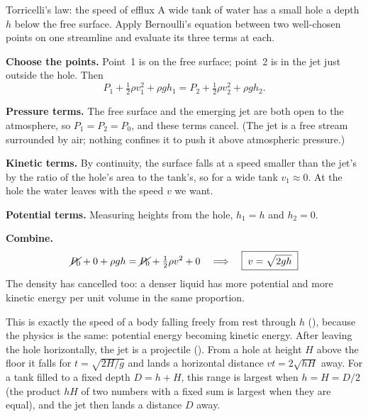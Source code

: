 \begin{derivbox}{Torricelli's law: the speed of efflux}
A wide tank of water has a small hole a depth $h$ below the free surface. Apply Bernoulli's equation between
two well-chosen points on one streamline and evaluate its three terms at each.

 \textbf{Choose the points.} Point~1 is on the free surface; point~2 is in the jet just outside the
hole. Then
\[
P_1+\tfrac12\rho v_1^2+\rho gh_1=P_2+\tfrac12\rho v_2^2+\rho gh_2.
\]

 \textbf{Pressure terms.} The free surface and the emerging jet are both open to the atmosphere,
so $P_1=P_2=P_0$, and these terms cancel. (The jet is a free stream surrounded by air; nothing confines it
to push it above atmospheric pressure.)

 \textbf{Kinetic terms.} By continuity, the surface falls at a speed smaller than the jet's by the
ratio of the hole's area to the tank's, so for a wide tank $v_1\approx0$. At the hole the water leaves
with the speed $v$ we want.

 \textbf{Potential terms.} Measuring heights from the hole, $h_1=h$ and $h_2=0$.

 \textbf{Combine.}
\[
\cancel{P_0}+0+\rho gh=\cancel{P_0}+\tfrac12\rho v^2+0
\quad\Longrightarrow\quad\boxed{\;v=\sqrt{2gh}\;}
\]
The density has cancelled too: a denser liquid has more potential and more kinetic energy per unit volume
in the same proportion.

\medskip
This is exactly the speed of a body falling freely from rest through $h$ (),
because the physics is the same: potential energy becoming kinetic energy. After leaving the hole
horizontally, the jet is a projectile (). From a hole at height $H$ above the floor
it falls for $t=\sqrt{2H/g}$ and lands a horizontal distance $vt=2\sqrt{hH}$ away. For a tank filled to a
fixed depth $D=h+H$, this range is largest when $h=H=D/2$ (the product $hH$ of two numbers with a fixed
sum is largest when they are equal), and the jet then lands a distance $D$ away.


\end{derivbox}
